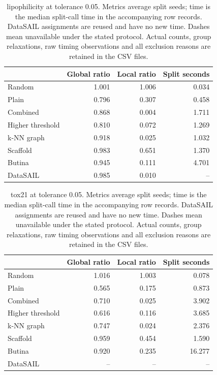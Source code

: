 \begin{table}[htbp]\centering\small
\begin{tabular}{lrrr}
\toprule
 & Global ratio & Local ratio & Split seconds \\
\midrule
Random & 1.001 & 1.006 & 0.034 \\
Plain & 0.796 & 0.307 & 0.458 \\
Combined & 0.868 & 0.004 & 1.711 \\
Higher threshold & 0.810 & 0.072 & 1.269 \\
k-NN graph & 0.918 & 0.025 & 1.032 \\
Scaffold & 0.983 & 0.651 & 1.370 \\
Butina & 0.945 & 0.111 & 4.701 \\
DataSAIL & 0.985 & 0.010 & -- \\
\bottomrule
\end{tabular}

\caption{lipophilicity at tolerance 0.05. Metrics average split seeds; time is the median split-call time in the accompanying row records. DataSAIL assignments are reused and have no new time. Dashes mean unavailable under the stated protocol. Actual counts, group relaxations, raw timing observations and all exclusion reasons are retained in the CSV files.}\end{table}
\begin{table}[htbp]\centering\small
\begin{tabular}{lrrr}
\toprule
 & Global ratio & Local ratio & Split seconds \\
\midrule
Random & 1.016 & 1.003 & 0.078 \\
Plain & 0.565 & 0.175 & 0.873 \\
Combined & 0.710 & 0.025 & 3.902 \\
Higher threshold & 0.616 & 0.116 & 3.685 \\
k-NN graph & 0.747 & 0.024 & 2.376 \\
Scaffold & 0.959 & 0.454 & 1.590 \\
Butina & 0.920 & 0.235 & 16.277 \\
DataSAIL & -- & -- & -- \\
\bottomrule
\end{tabular}

\caption{tox21 at tolerance 0.05. Metrics average split seeds; time is the median split-call time in the accompanying row records. DataSAIL assignments are reused and have no new time. Dashes mean unavailable under the stated protocol. Actual counts, group relaxations, raw timing observations and all exclusion reasons are retained in the CSV files.}\end{table}
